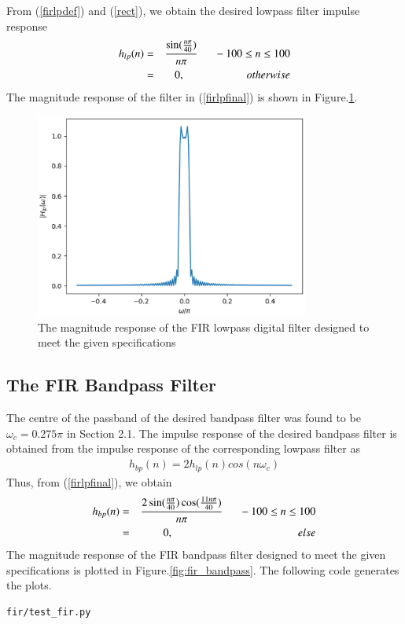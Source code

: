 \documentclass[journal,12pt,twocolumn]{IEEEtran}
\begin{document}
From (\ref{firlpdef}) and (\ref{rect}), we obtain the desired lowpass filter impulse response
\begin{eqnarray}
\label{firlpfinal}
h_{lp}(n) &=& \frac{\sin(\frac{n\pi}{40})}{n\pi} \indent -100 \leq n \leq 100 \nonumber \\
&=& 0, \hspace{2cm} \mbox{otherwise}
\end{eqnarray}
The magnitude  response of the filter in (\ref{firlpfinal}) is shown in Figure.\ref{fig:fir_lowpass}.
\begin{figure}
    \centering
    \includegraphics[width = 9cm]{./figs/fir/ee18btech11017_fir_lp.eps}
    \caption{The magnitude response of the FIR lowpass digital filter designed to meet the given specifications} 
    \label{fig:fir_lowpass}
\end{figure}

\subsection{The FIR Bandpass Filter}
The centre of the passband of the desired bandpass filter was found to be $\omega_c = 0.275\pi$ in Section
2.1.  The impulse response of the desired bandpass filter is obtained from the impulse response of the
corresponding lowpass filter as
\begin{eqnarray}
h_{bp}(n) = 2h_{lp}(n)cos(n\omega_c)
\end{eqnarray}
Thus, from (\ref{firlpfinal}), we obtain
\begin{eqnarray}
\label{firbpfinal}
h_{bp}(n) &=& \frac{2\sin(\frac{n\pi}{40}) \cos(\frac{11n\pi}{40})}{n\pi} \indent -100 \leq n \leq 100 \nonumber \\
&=& 0, \hspace{4cm} \mbox{else}
\end{eqnarray}
%
The magnitude response of the FIR bandpass filter designed to meet the given specifications is plotted in Figure.\ref{fig:fir_bandpass}.
The following code generates the plots.
\begin{lstlisting}
fir/test_fir.py
\end{lstlisting}
\end{document}
